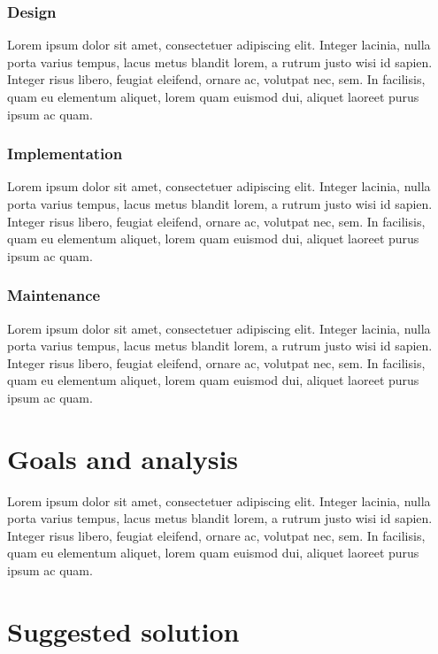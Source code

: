 \documentclass[thesismargins, english, thesislinespacing, twoside, openright, upjsfrontpage]{rnthesis}
\begin{document}
\subsection{Design}

Lorem ipsum dolor sit amet, consectetuer adipiscing elit.
Integer lacinia, nulla porta varius tempus, lacus metus blandit
lorem, a rutrum justo wisi id sapien. Integer risus libero,
feugiat eleifend, ornare ac, volutpat nec, sem. In facilisis,
quam eu elementum aliquet, lorem quam euismod dui, aliquet
laoreet purus ipsum ac quam.

\subsection{Implementation}

Lorem ipsum dolor sit amet, consectetuer adipiscing elit.
Integer lacinia, nulla porta varius tempus, lacus metus blandit
lorem, a rutrum justo wisi id sapien. Integer risus libero,
feugiat eleifend, ornare ac, volutpat nec, sem. In facilisis,
quam eu elementum aliquet, lorem quam euismod dui, aliquet
laoreet purus ipsum ac quam.

\subsection{Maintenance}

Lorem ipsum dolor sit amet, consectetuer adipiscing elit.
Integer lacinia, nulla porta varius tempus, lacus metus blandit
lorem, a rutrum justo wisi id sapien. Integer risus libero,
feugiat eleifend, ornare ac, volutpat nec, sem. In facilisis,
quam eu elementum aliquet, lorem quam euismod dui, aliquet
laoreet purus ipsum ac quam.

\chapter{Goals and analysis}

Lorem ipsum dolor sit amet, consectetuer adipiscing elit.
Integer lacinia, nulla porta varius tempus, lacus metus blandit
lorem, a rutrum justo wisi id sapien. Integer risus libero,
feugiat eleifend, ornare ac, volutpat nec, sem. In facilisis,
quam eu elementum aliquet, lorem quam euismod dui, aliquet
laoreet purus ipsum ac quam.

\chapter{Suggested solution}
\end{document}

